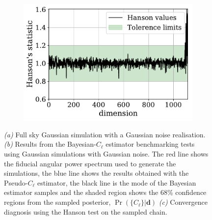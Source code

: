 \begin{figure}
\begin{subfigure}{.5\textwidth}
  \includegraphics[scale=0.50]{BPL-FIGS/GenData-FullSky-N16_Hanson.pdf}
  \caption{}
\end{subfigure}
\caption[Bayesian-$C_{\ell}$ estimator tested on a full sky Gaussian simulation.]{\textit{(a)} Full sky Gaussian simulation with a Gaussian noise realisation.  \textit{(b)} Results from the Bayesian-$C_{\ell}$ estimator benchmarking tests using Gaussian simulations with Gaussian noise. The red line shows the fiducial angular power spectrum used to generate the simulations, the blue line shows the results obtained with the Pseudo-$C_{\ell}$ estimator, the black line is the mode of the Bayesian estimator samples and the shaded region shows the 68\% confidence regions from the sampled posterior, $\Pr (\{C_{\ell}\}|\mathbf{d})$ \textit{(c)} Convergence diagnosis using the Hanson test on the sampled chain.}%
\label{fig:BPL:GaussianFSAnalysis}
\end{figure}
